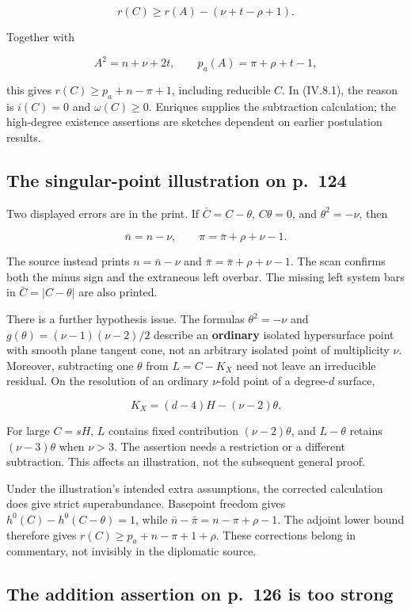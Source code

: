 \[
r(C)\ge r(A)-(\nu+t-\rho+1).
\]

Together with

\[
A^2=n+\nu+2t,\qquad p_a(A)=\pi+\rho+t-1,
\]

this gives \(r(C)\ge p_a+n-\pi+1\), including reducible \(C\). In (IV.8.1), the reason is \(i(C)=0\) and \(\omega(C)\ge0\). Enriques supplies the subtraction calculation; the high-degree existence assertions are sketches dependent on earlier postulation results.

\subsection{The singular-point illustration on p.~124}

Two displayed errors are in the print. If \(\bar C=C-\theta\), \(C\theta=0\), and \(\theta^2=-\nu\), then

\[
\bar n=n-\nu,\qquad \pi=\bar\pi+\rho+\nu-1.
\]

The source instead prints \(n=\bar n-\nu\) and \(\bar\pi=\bar\pi+\rho+\nu-1\). The scan confirms both the minus sign and the extraneous left overbar. The missing left system bars in \(\bar C=|C-\theta|\) are also printed.

There is a further hypothesis issue. The formulas \(\theta^2=-\nu\) and \(g(\theta)=(\nu-1)(\nu-2)/2\) describe an \textbf{ordinary} isolated hypersurface point with smooth plane tangent cone, not an arbitrary isolated point of multiplicity \(\nu\). Moreover, subtracting one \(\theta\) from \(L=C-K_X\) need not leave an irreducible residual. On the resolution of an ordinary \(\nu\)-fold point of a degree-\(d\) surface,

\[
K_X=(d-4)H-(\nu-2)\theta.
\]

For large \(C=sH\), \(L\) contains fixed contribution \((\nu-2)\theta\), and \(L-\theta\) retains \((\nu-3)\theta\) when \(\nu>3\). The assertion needs a restriction or a different subtraction. This affects an illustration, not the subsequent general proof.

Under the illustration's intended extra assumptions, the corrected calculation does give strict superabundance. Basepoint freedom gives \(h^0(C)-h^0(C-\theta)=1\), while \(\bar n-\bar\pi=n-\pi+\rho-1\). The adjoint lower bound therefore gives \(r(C)\ge p_a+n-\pi+1+\rho\). These corrections belong in commentary, not invisibly in the diplomatic source.

\subsection{The addition assertion on p.~126 is too strong}

